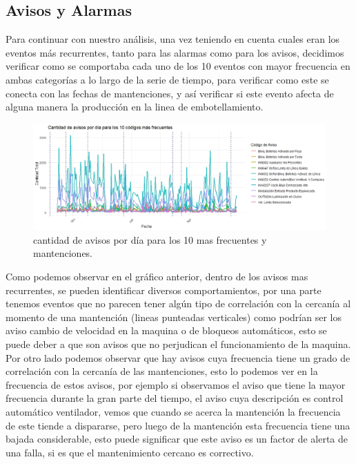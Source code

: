 \documentclass[10pt]{article}
\begin{document}
\subsection{Avisos y Alarmas}
Para continuar con nuestro análisis, una vez teniendo en cuenta cuales eran los eventos más recurrentes, tanto para las alarmas como para los avisos, decidimos verificar como se comportaba cada uno de los 10 eventos con mayor frecuencia en ambas categorías a lo largo de la serie de tiempo, para verificar como este se conecta con las fechas de mantenciones, y así verificar si este evento afecta de alguna manera la producción en la linea de embotellamiento.
\\
\begin{figure}[H]
\includegraphics[width=1.1\textwidth]{Graficos/AVISOS_MANTENCIONES_FINAL_TOP10.jpeg}
\caption{cantidad de avisos por día para los 10 mas frecuentes y mantenciones.}
\end{figure}


Como podemos observar en el gráfico anterior, dentro de los avisos mas recurrentes, se pueden identificar diversos comportamientos, por una parte tenemos eventos que no parecen tener algún tipo de correlación con la cercanía al momento de una mantención (lineas punteadas verticales) como podrían ser los aviso cambio de velocidad en la maquina o de bloqueos automáticos, esto se puede deber a que son avisos que no perjudican el funcionamiento de la maquina. Por otro lado podemos observar que hay avisos cuya frecuencia tiene un grado de correlación con la cercanía de las mantenciones, esto lo podemos ver en la frecuencia de estos avisos, por ejemplo si observamos el aviso que tiene la mayor frecuencia durante la gran parte del tiempo, el aviso cuya descripción es control automático ventilador, vemos que cuando se acerca la mantención la frecuencia de este tiende a dispararse, pero luego de la mantención esta frecuencia tiene una bajada considerable, esto puede significar que este aviso es un factor de alerta de una falla, si es que el mantenimiento cercano es correctivo.
\end{document}
